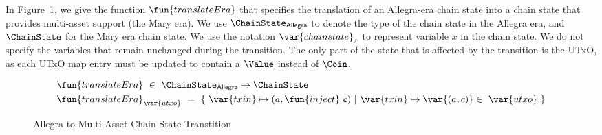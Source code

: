 In Figure~\ref{fig:functions:to-ma}, we give the function $\fun{translateEra}$ that
specifies the translation of an Allegra-era chain state into a chain state that provides multi-asset support
(the Mary era).
We use $\ChainState_{\mathsf{Allegra}}$ to denote the type of the chain state
in the Allegra era, and $\ChainState$ for the Mary era chain state.
We use the notation $\var{chainstate}_x$ to represent
variable $x$ in the chain state. We do not specify the variables that remain
unchanged during the transition.
The only part of the state that is affected by the transition is the UTxO, as
each UTxO map entry must be updated to contain a $\Value$ instead of $\Coin$.

\begin{figure}[htb]
  \begin{align*}
      & \fun{translateEra} ~\in~ \ChainState_{\mathsf{Allegra}}  \to \ChainState  \\
      & \fun{translateEra}_{\var{utxo}} ~=~ \{~ \var{txin} \mapsto (a,\fun{inject}~c) ~\vert~
      \var{txin} \mapsto \var{(a,c)}\in ~\var{utxo}~\}
  \end{align*}
  \caption{Allegra to Multi-Asset Chain State Transtition}
  \label{fig:functions:to-ma}
\end{figure}
